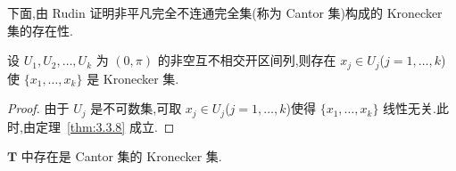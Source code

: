 下面,由 Rudin \cite{ch3:11} 证明非平凡完全不连通完全集(称为 Cantor 集)构成的 Kronecker 集的存在性.

\begin{lemma}\label{lem:3.3.10}
设 $U_{1}, U_{2}, \ldots, U_{k}$ 为 $(0, \pi)$ 的非空互不相交开区间列,则存在 $x_{j} \in U_{j}$($j = 1, \ldots, k$)使 $\{x_{1}, \ldots, x_{k}\}$ 是 Kronecker 集.
\end{lemma}

\begin{proof}
由于 $U_{j}$ 是不可数集,可取 $x_{j} \in U_{j}$($j = 1, \ldots, k$)使得 $\{x_{1}, \ldots, x_{k}\}$ 线性无关.此时,由定理~\ref{thm:3.3.8} 成立.
\end{proof}

\begin{theorem}\label{thm:3.3.11}
$\mathbf{T}$ 中存在是 Cantor 集的 Kronecker 集.
\end{theorem}

